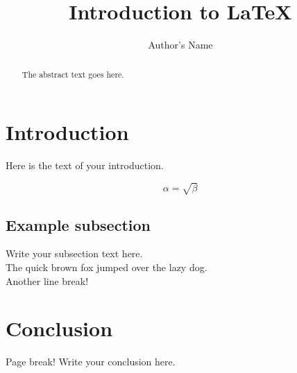 \documentclass{article}
\begin{document}
\title{Introduction to \LaTeX{}}
\author{Author's Name}

\maketitle

\begin{abstract}
The abstract text goes here.\\
\end{abstract}

\section{Introduction}
Here is the text of your introduction.

\begin{equation}
	\label{simple_equation}
	\alpha = \sqrt{ \beta }
\end{equation}

\subsection{Example subsection}
Write your subsection text here. \\ The quick brown fox jumped over the lazy dog.
\\ Another line break!

\newpage
\section{Conclusion}
Page break!
Write your conclusion here.
\end{document}
